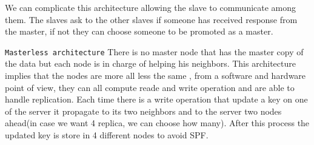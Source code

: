 We can complicate this architecture allowing the slave to communicate among them. The slaves ask to the other slaves if someone has received response from the master, if not they can choose someone to be promoted as a master. 

\texttt{Masterless architecture}
There is no master node that has the master copy of the data but each node is in charge of helping his neighbors. This architecture implies that the nodes are more all less the same , from a software and hardware point of view, they can all compute reade and write operation and are able to handle replication. Each time there is a write operation that update a key on one of the server it propagate to its two neighbors and to the server two nodes ahead(in case we want 4 replica, we can choose how many). After this process the updated key is store in 4 different nodes to avoid SPF.


